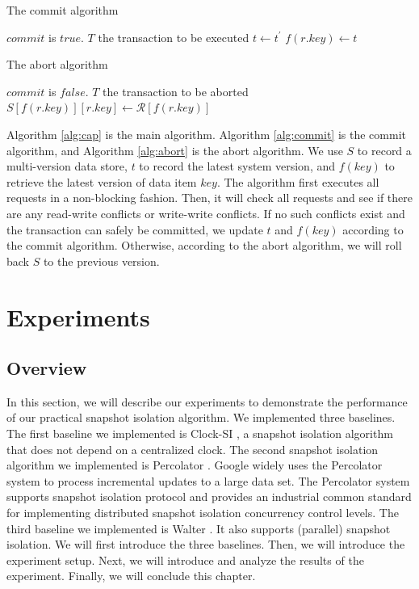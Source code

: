 \begin{algorithm}
\caption{The commit algorithm}\label{alg:commit}
\begin{algorithmic}
\Require $commit$ is $true$.
\Require $T$ the transaction to be executed
\State $t \gets t^\prime$ 
 
\State $f(r.key) \gets t$
\EndIf
\EndFor
\end{algorithmic}
\end{algorithm}



\begin{algorithm}
\caption{The abort algorithm}\label{alg:abort}
\begin{algorithmic}
\Require $commit$ is $false$.
\Require $T$ the transaction to be aborted
\State $S[f(r.key)][r.key] \gets \mathcal R[f(r.key)]$ 
\EndIf
\EndFor
\end{algorithmic}
\end{algorithm}


Algorithm \ref{alg:cap} is the main algorithm. Algorithm \ref{alg:commit} is the commit algorithm, and Algorithm \ref{alg:abort} is the abort algorithm. 
We use $S$ to record a multi-version data store, $t$ to record the latest system version, and $f(key)$ to retrieve the latest version of data item $key$. The algorithm first executes all requests in a non-blocking fashion. Then, it will check all requests and see if there are any read-write conflicts or write-write conflicts. If no such conflicts exist and the transaction can safely be committed, we update $t$ and $f(key)$ according to the commit algorithm. Otherwise, according to the abort algorithm, we will roll back $S$ to the previous version.  


\section{Experiments}
\subsection{Overview}
In this section, we will describe our experiments to demonstrate the performance of our practical snapshot isolation algorithm. We implemented three baselines. The first baseline we implemented is Clock-SI \cite{du2013clock}, a snapshot isolation algorithm that does not depend on a centralized clock. The second snapshot isolation algorithm we implemented is Percolator \cite{peng2010large}. Google widely uses the Percolator system to process incremental updates to a large data set. The Percolator system supports snapshot isolation protocol and provides an industrial common standard for implementing distributed snapshot isolation concurrency control levels. The third baseline we implemented is Walter \cite{sovran2011transactional}. It also supports (parallel) snapshot isolation. We will first introduce the three baselines. Then, we will introduce the experiment setup. Next, we will introduce and analyze the results of the experiment. Finally,  we will conclude this chapter. 


